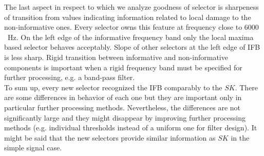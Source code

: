 \documentclass[3p,times]{elsarticle}
\begin{document}
The last aspect in respect to which we analyze goodness of selector is sharpeness of transition from values indicating information related to local damage to the non-informative ones. Every selector owns this feature at frequency close to $6000$~Hz. On the left edge of the informative frequency band only the local maxima based selector behaves acceptably. Slope of other selectors at the left edge of IFB is less sharp. Rigid transition between informative and non-informative components is important when a rigid frequency band must be specified for further processing, e.g. a band-pass filter.\\
To sum up, every new selector recognized the IFB comparably to the $SK$. There are some differences in behavior of each one but they are important only in particular further processing methods. Nevertheless, the differences are not significantly large and they might disappear by improving further processing methods (e.g. individual thresholds instead of a uniform one for filter design). It might be said that the new selectors provide similar information as $SK$ in the simple signal case.
\end{document}
